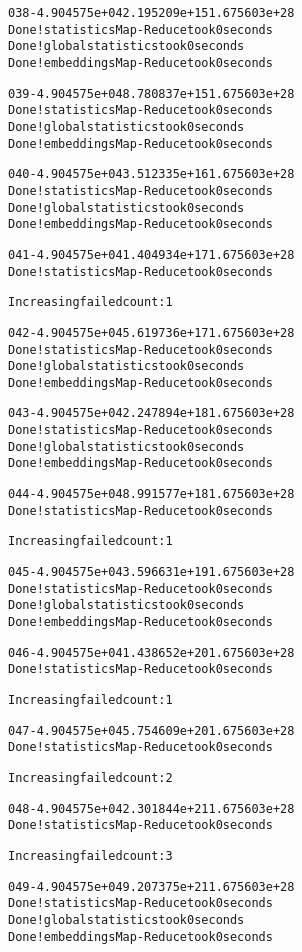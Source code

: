 \documentclass[letterpaper,10pt,english]{/usr/share/sphinx/texinputs/sphinxhowto}
\newenvironment{InvisibleVerbatim}
        {\begin{mdframed}[leftmargin=0.1\linewidth,innerleftmargin=3pt,innerrightmargin=3pt, userdefinedwidth=1\linewidth, linewidth=0pt, linecolor=white, usetwoside=false]}
        {\end{mdframed}}
\begin{document}
\begin{InvisibleVerbatim}
\begin{alltt}
 038  -4.904575e+04   2.195209e+15   1.675603e+28
Done! statistics Map-Reduce took  0  seconds
Done! global statistics took  0  seconds
Done! embeddings Map-Reduce took  0  seconds

 039  -4.904575e+04   8.780837e+15   1.675603e+28
Done! statistics Map-Reduce took  0  seconds
Done! global statistics took  0  seconds
Done! embeddings Map-Reduce took  0  seconds

 040  -4.904575e+04   3.512335e+16   1.675603e+28
Done! statistics Map-Reduce took  0  seconds
Done! global statistics took  0  seconds
Done! embeddings Map-Reduce took  0  seconds

 041  -4.904575e+04   1.404934e+17   1.675603e+28
Done! statistics Map-Reduce took  0  seconds

        Increasing failed count: 1


 042  -4.904575e+04   5.619736e+17   1.675603e+28
Done! statistics Map-Reduce took  0  seconds
Done! global statistics took  0  seconds
Done! embeddings Map-Reduce took  0  seconds

 043  -4.904575e+04   2.247894e+18   1.675603e+28
Done! statistics Map-Reduce took  0  seconds
Done! global statistics took  0  seconds
Done! embeddings Map-Reduce took  0  seconds

 044  -4.904575e+04   8.991577e+18   1.675603e+28
Done! statistics Map-Reduce took  0  seconds

        Increasing failed count: 1


 045  -4.904575e+04   3.596631e+19   1.675603e+28
Done! statistics Map-Reduce took  0  seconds
Done! global statistics took  0  seconds
Done! embeddings Map-Reduce took  0  seconds

 046  -4.904575e+04   1.438652e+20   1.675603e+28
Done! statistics Map-Reduce took  0  seconds

        Increasing failed count: 1


 047  -4.904575e+04   5.754609e+20   1.675603e+28
Done! statistics Map-Reduce took  0  seconds

        Increasing failed count: 2


 048  -4.904575e+04   2.301844e+21   1.675603e+28
Done! statistics Map-Reduce took  0  seconds

        Increasing failed count: 3


 049  -4.904575e+04   9.207375e+21   1.675603e+28
Done! statistics Map-Reduce took  0  seconds
Done! global statistics took  0  seconds
Done! embeddings Map-Reduce took  0  seconds


\end{alltt}
\end{InvisibleVerbatim}
\end{document}
